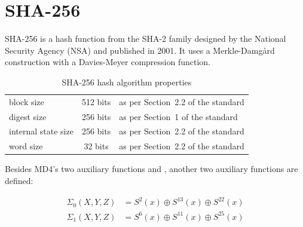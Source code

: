 \section{SHA-256}
\label{sec:dc-sha-256}
%
SHA-256 is a hash function from the SHA-2 family designed by the National Security Agency (NSA)
and published in 2001. It uses a Merkle-Damg\aa{}rd construction with a Davies-Meyer
compression function.

\begin{table}[h]
  \begin{center}
    \begin{tabular}{lcl}
      block size           & 512 bits       & as per Section~2.2 of the standard \\
      digest size          & 256 bits       & as per Section~1 of the standard \\
      internal state size  & 256 bits       & as per Section~2.2 of the standard \\
      word size            & 32 bits        & as per Section~2.2 of the standard \\
    \end{tabular}
    \caption{SHA-256 hash algorithm properties}
    \label{tab:sha256}
  \end{center}
\end{table}

Besides MD4's two auxiliary functions  and ,
another two auxiliary functions are defined:

\begin{align}
  \Sigma_0(X,Y,Z) &= S^2(x) \oplus S^{13}(x) \oplus S^{22}(x) \\
  \Sigma_1(X,Y,Z) &= S^6(x) \oplus S^{11}(x) \oplus S^{25}(x)
\end{align}

